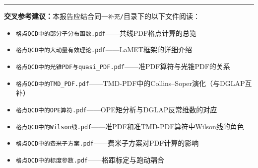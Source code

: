 \documentclass[12pt,a4paper]{ctexart}
\theoremstyle{definition}
\begin{document}
\vspace{0.5cm}
\noindent\rule{\textwidth}{0.5pt}
\small
\textbf{交叉参考建议：}本报告应结合同一\texttt{补充/}目录下的以下文件阅读：
\begin{itemize}[nosep]
    \item \texttt{格点QCD中的部分子分布函数.pdf}——共线PDF格点计算的总览
    \item \texttt{格点QCD中的大动量有效理论.pdf}——LaMET框架的详细介绍
    \item \texttt{格点QCD中的光锥PDF与quasi\_PDF.pdf}——准PDF算符与光锥PDF的关系
    \item \texttt{格点QCD中的TMD\_PDF.pdf}——TMD-PDF中的Collins--Soper演化（与DGLAP互补）
    \item \texttt{格点QCD中的OPE算符.pdf}——OPE矩分析与DGLAP反常维数的对应
    \item \texttt{格点QCD中的Wilson线.pdf}——准PDF和准TMD-PDF算符中Wilson线的角色
    \item \texttt{格点QCD中的费米子方案.pdf}——费米子方案对PDF计算的影响
    \item \texttt{格点QCD中的标度参数.pdf}——格距标定与跑动耦合
\end{itemize}
\end{document}
